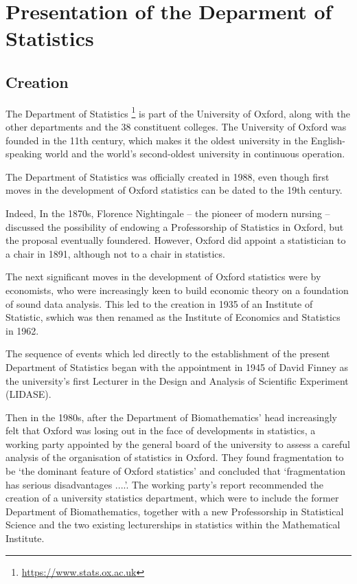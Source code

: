 

\chapter{Presentation of the Deparment of Statistics}


\section{Creation}
\quad The Department of Statistics \footnote{\url{https://www.stats.ox.ac.uk}} is part of the University of Oxford, along with the other departments and the 38 constituent colleges.
The University of Oxford was founded in the 11th century, which makes it the oldest university in the English-speaking world and the world's second-oldest university in continuous operation.

The Department of Statistics was officially created in 1988, even though first moves in the development of Oxford statistics can be dated to the 19th century.

Indeed, In the 1870s, Florence Nightingale -- the pioneer of modern nursing -- discussed the possibility of endowing a Professorship of Statistics in Oxford, but the proposal eventually foundered.
However, Oxford did appoint a statistician to a chair in 1891, although not to a chair in statistics.

The next significant moves in the development of Oxford statistics were by economists, who were increasingly keen to build economic theory on a foundation of sound data analysis.
This led to the creation in 1935 of an Institute of Statistic, swhich was then renamed as the Institute of Economics and Statistics in 1962. 

The sequence of events which led directly to the establishment of the present Department of Statistics began with the appointment in 1945 of David Finney as the university’s first Lecturer in the Design and Analysis of Scientific Experiment (LIDASE).

Then in the 1980s, after the Department of Biomathematics' head increasingly felt that Oxford was losing out in the face of developments in statistics, a working party appointed by the general board of the university to assess a careful analysis of the organisation of statistics in Oxford. 
They found fragmentation to be ‘the dominant feature of Oxford statistics’ and concluded that ‘fragmentation has serious disadvantages ....’.
The working party’s report recommended the creation of a university statistics department, which were to include the former Department of Biomathematics, together with a new Professorship in Statistical Science and the two existing lecturerships in statistics within the Mathematical Institute.

